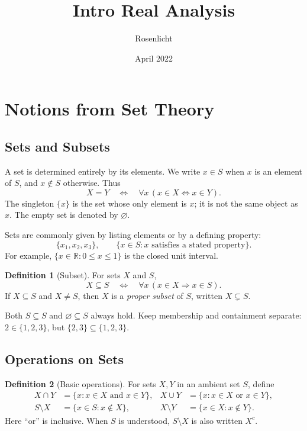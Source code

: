 \documentclass{article}
\title{Intro Real Analysis}
\author{Rosenlicht}
\date{April 2022}
\theoremstyle{definition}
\newtheorem{definition}{Definition}[section]
\theoremstyle{plain}
\begin{document}
	
	\maketitle
	\tableofcontents
	
\section{Notions from Set Theory}\label{sec:set-theory}

\subsection{Sets and Subsets}\label{subsec:sets-elements}
A set is determined entirely by its elements.  We write $x\in S$ when $x$ is an element of $S$, and $x\notin S$ otherwise.  Thus
\[
	X=Y \quad\Longleftrightarrow\quad \forall x\,(x\in X \Leftrightarrow x\in Y).
\]
The singleton $\{x\}$ is the set whose only element is $x$; it is not the same object as $x$.  The empty set is denoted by $\varnothing$.

Sets are commonly given by listing elements or by a defining property:
\[
	\{x_1,x_2,x_3\},
	\qquad
	\{x\in S: x \text{ satisfies a stated property}\}.
\]
For example, $\{x\in\mathbb R:0\le x\le1\}$ is the closed unit interval.

\begin{definition}[Subset]\label{def:subset}
For sets $X$ and $S$,
\[
	X\subseteq S \quad\Longleftrightarrow\quad \forall x\,(x\in X\Rightarrow x\in S).
\]
If $X\subseteq S$ and $X\ne S$, then $X$ is a \emph{proper subset} of $S$, written $X\subsetneq S$.
\end{definition}

Both $S\subseteq S$ and $\varnothing\subseteq S$ always hold.  Keep membership and containment separate: $2\in\{1,2,3\}$, but $\{2,3\}\subseteq\{1,2,3\}$.

\subsection{Operations on Sets}\label{subsec:set-operations}
\begin{definition}[Basic operations]\label{def:union-intersection}\label{def:complement}
For sets $X,Y$ in an ambient set $S$, define
\begin{align*}
	X\cap Y &= \{x:x\in X \text{ and } x\in Y\}, &
	X\cup Y &= \{x:x\in X \text{ or } x\in Y\},\\
	S\setminus X &= \{x\in S:x\notin X\}, &
	X\setminus Y &= \{x\in X:x\notin Y\}.
\end{align*}
Here ``or'' is inclusive.  When $S$ is understood, $S\setminus X$ is also written $X^c$.
\end{definition}
\end{document}
